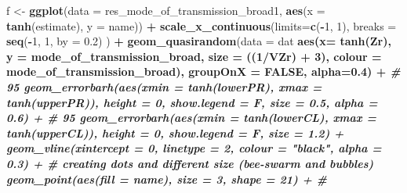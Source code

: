 \documentclass[
]{article}
\newenvironment{Shaded}{\begin{snugshade}}{\end{snugshade}}
\newcommand{\CommentTok}[1]{\textcolor[rgb]{0.56,0.35,0.01}{\textit{#1}}}
\newcommand{\DataTypeTok}[1]{\textcolor[rgb]{0.13,0.29,0.53}{#1}}
\newcommand{\DecValTok}[1]{\textcolor[rgb]{0.00,0.00,0.81}{#1}}
\newcommand{\FloatTok}[1]{\textcolor[rgb]{0.00,0.00,0.81}{#1}}
\newcommand{\KeywordTok}[1]{\textcolor[rgb]{0.13,0.29,0.53}{\textbf{#1}}}
\newcommand{\NormalTok}[1]{#1}
\newcommand{\OperatorTok}[1]{\textcolor[rgb]{0.81,0.36,0.00}{\textbf{#1}}}
\newcommand{\OtherTok}[1]{\textcolor[rgb]{0.56,0.35,0.01}{#1}}
\newcommand{\StringTok}[1]{\textcolor[rgb]{0.31,0.60,0.02}{#1}}
\begin{document}
\begin{Shaded}
\begin{Highlighting}[]
\NormalTok{f <-}\StringTok{ }\KeywordTok{ggplot}\NormalTok{(}\DataTypeTok{data =}\NormalTok{ res_mode_of_transmission_broad1, }\KeywordTok{aes}\NormalTok{(}\DataTypeTok{x =} \KeywordTok{tanh}\NormalTok{(estimate), }\DataTypeTok{y =}\NormalTok{ name)) }\OperatorTok{+}
\StringTok{  }\KeywordTok{scale_x_continuous}\NormalTok{(}\DataTypeTok{limits=}\KeywordTok{c}\NormalTok{(}\OperatorTok{-}\DecValTok{1}\NormalTok{, }\DecValTok{1}\NormalTok{), }\DataTypeTok{breaks =} \KeywordTok{seq}\NormalTok{(}\OperatorTok{-}\DecValTok{1}\NormalTok{, }\DecValTok{1}\NormalTok{, }\DataTypeTok{by =} \FloatTok{0.2}\NormalTok{) ) }\OperatorTok{+}
\StringTok{  }\KeywordTok{geom_quasirandom}\NormalTok{(}\DataTypeTok{data =}\NormalTok{ dat }\OperatorTok{%
                   \KeywordTok{aes}\NormalTok{(}\DataTypeTok{x=} \KeywordTok{tanh}\NormalTok{(Zr), }\DataTypeTok{y =}\NormalTok{ mode_of_transmission_broad, }\DataTypeTok{size =}\NormalTok{ ((}\DecValTok{1}\OperatorTok{/}\NormalTok{VZr) }\OperatorTok{+}\StringTok{ }\DecValTok{3}\NormalTok{), }\DataTypeTok{colour =}\NormalTok{ mode_of_transmission_broad), }\DataTypeTok{groupOnX =} \OtherTok{FALSE}\NormalTok{, }\DataTypeTok{alpha=}\FloatTok{0.4}\NormalTok{) }\OperatorTok{+}\StringTok{ }
\StringTok{  }\CommentTok{# 95 %
\StringTok{  }\KeywordTok{geom_errorbarh}\NormalTok{(}\KeywordTok{aes}\NormalTok{(}\DataTypeTok{xmin =} \KeywordTok{tanh}\NormalTok{(lowerPR), }\DataTypeTok{xmax =} \KeywordTok{tanh}\NormalTok{(upperPR)),  }\DataTypeTok{height =} \DecValTok{0}\NormalTok{, }\DataTypeTok{show.legend =}\NormalTok{ F, }\DataTypeTok{size =} \FloatTok{0.5}\NormalTok{, }\DataTypeTok{alpha =} \FloatTok{0.6}\NormalTok{) }\OperatorTok{+}
\StringTok{  }\CommentTok{# 95 %
\StringTok{  }\KeywordTok{geom_errorbarh}\NormalTok{(}\KeywordTok{aes}\NormalTok{(}\DataTypeTok{xmin =} \KeywordTok{tanh}\NormalTok{(lowerCL), }\DataTypeTok{xmax =} \KeywordTok{tanh}\NormalTok{(upperCL)),  }\DataTypeTok{height =} \DecValTok{0}\NormalTok{, }\DataTypeTok{show.legend =}\NormalTok{ F, }\DataTypeTok{size =} \FloatTok{1.2}\NormalTok{) }\OperatorTok{+}
\StringTok{  }\KeywordTok{geom_vline}\NormalTok{(}\DataTypeTok{xintercept =} \DecValTok{0}\NormalTok{, }\DataTypeTok{linetype =} \DecValTok{2}\NormalTok{, }\DataTypeTok{colour =} \StringTok{"black"}\NormalTok{, }\DataTypeTok{alpha =} \FloatTok{0.3}\NormalTok{) }\OperatorTok{+}
\StringTok{  }\CommentTok{# creating dots and different size (bee-swarm and bubbles)}
\StringTok{  }\KeywordTok{geom_point}\NormalTok{(}\KeywordTok{aes}\NormalTok{(}\DataTypeTok{fill =}\NormalTok{ name), }\DataTypeTok{size =} \DecValTok{3}\NormalTok{, }\DataTypeTok{shape =} \DecValTok{21}\NormalTok{) }\OperatorTok{+}\StringTok{ }\CommentTok{#}
}}}
\end{Highlighting}
\end{Shaded}
\end{document}

